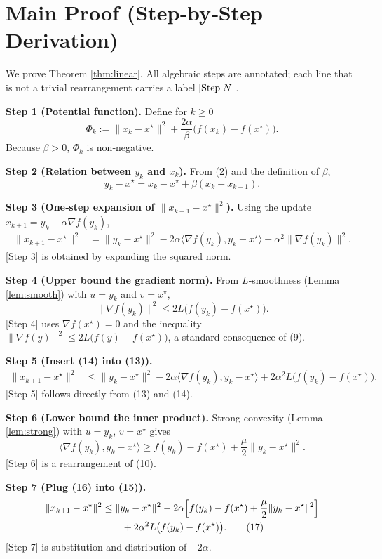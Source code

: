 \documentclass{article}
\begin{document}
\section*{Main Proof (Step‑by‑Step Derivation)}
We prove Theorem \ref{thm:linear}.  
All algebraic steps are annotated; each line that is not a trivial rearrangement carries a label \([{\rm Step}\;N]\).

\bigskip
\noindent\textbf{Step 1 (Potential function).}  
Define for $k\ge0$
\[
\Phi_k:=\|x_k-x^\star\|^2 + \frac{2\alpha}{\beta}\bigl(f(x_k)-f(x^\star)\bigr).
\tag{11}
\]
Because $\beta>0$, $\Phi_k$ is non‑negative.

\noindent\textbf{Step 2 (Relation between $y_k$ and $x_k$).}  
From (2) and the definition of $\beta$,
\[
y_k-x^\star = x_k-x^\star + \beta (x_k-x_{k-1}) .
\tag{12}
\]

\noindent\textbf{Step 3 (One‑step expansion of $\|x_{k+1}-x^\star\|^2$).}  
Using the update $x_{k+1}=y_k-\alpha\nabla f(y_k)$,
\begin{align}
\|x_{k+1}-x^\star\|^2
&=\|y_k-x^\star\|^2-2\alpha\langle\nabla f(y_k),y_k-x^\star\rangle+\alpha^2\|\nabla f(y_k)\|^2 .
\tag{13}
\end{align}
[Step 3] is obtained by expanding the squared norm.

\noindent\textbf{Step 4 (Upper bound the gradient norm).}  
From $L$‑smoothness (Lemma \ref{lem:smooth}) with $u=y_k$ and $v=x^\star$,
\[
\|\nabla f(y_k)\|^2 \le 2L\bigl(f(y_k)-f(x^\star)\bigr) .
\tag{14}
\]
[Step 4] uses $\nabla f(x^\star)=0$ and the inequality $\|\nabla f(y)\|^2 \le 2L\bigl(f(y)-f(x^\star)\bigr)$, a standard consequence of (9).

\noindent\textbf{Step 5 (Insert (14) into (13)).}
\begin{align}
\|x_{k+1}-x^\star\|^2
&\le \|y_k-x^\star\|^2-2\alpha\langle\nabla f(y_k),y_k-x^\star\rangle
   +2\alpha^2L\bigl(f(y_k)-f(x^\star)\bigr) .
\tag{15}
\end{align}
[Step 5] follows directly from (13) and (14).

\noindent\textbf{Step 6 (Lower bound the inner product).}  
Strong convexity (Lemma \ref{lem:strong}) with $u=y_k$, $v=x^\star$ gives
\[
\langle\nabla f(y_k),y_k-x^\star\rangle\ge f(y_k)-f(x^\star)+\frac{\mu}{2}\|y_k-x^\star\|^2 .
\tag{16}
\]
[Step 6] is a rearrangement of (10).

\noindent\textbf{Step 7 (Plug (16) into (15)).}
\begin{align}
\|x_{k+1}-x^\star\|^2
&\le \|y_k-x^\star\|^2-2\alpha\Bigl[f(y_k)-f(x^\star)+\frac{\mu}{2}\|y_k-x^\star\|^2\Bigr] \nonumber\\
&\qquad +2\alpha^2L\bigl(f(y_k)-f(x^\star)\bigr) .
\tag{17}
\end{align}
[Step 7] is substitution and distribution of $-2\alpha$.
\end{document}
